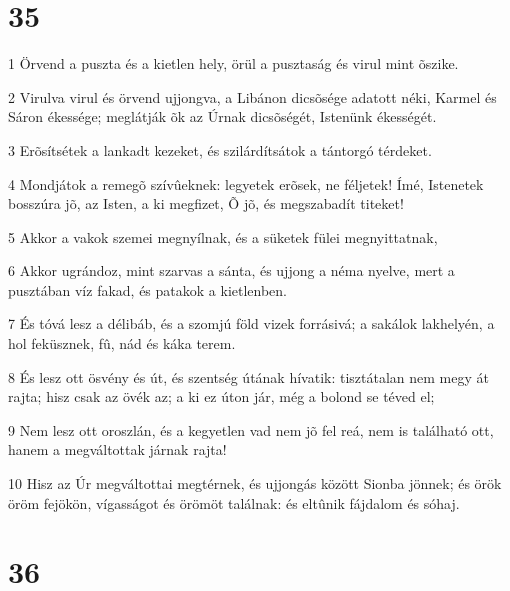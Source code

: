 \chapter{35}

\par 1 Örvend a puszta és a kietlen hely, örül a pusztaság és virul mint õszike.
\par 2 Virulva virul és örvend ujjongva, a Libánon dicsõsége adatott néki, Karmel és Sáron ékessége; meglátják õk az Úrnak dicsõségét, Istenünk ékességét.
\par 3 Erõsítsétek a lankadt kezeket, és szilárdítsátok a tántorgó térdeket.
\par 4 Mondjátok a remegõ szívûeknek: legyetek erõsek, ne féljetek! Ímé, Istenetek bosszúra jõ, az Isten, a ki megfizet, Õ jõ, és megszabadít titeket!
\par 5 Akkor a vakok szemei megnyílnak, és a süketek fülei megnyittatnak,
\par 6 Akkor ugrándoz, mint szarvas a sánta, és ujjong a néma nyelve, mert a pusztában víz fakad, és patakok a kietlenben.
\par 7 És tóvá lesz a délibáb, és a szomjú föld vizek forrásivá; a sakálok lakhelyén, a hol feküsznek, fû, nád és káka terem.
\par 8 És lesz ott ösvény és út, és szentség útának hívatik: tisztátalan nem megy át rajta; hisz csak az övék az; a ki ez úton jár, még a bolond se téved el;
\par 9 Nem lesz ott oroszlán, és a kegyetlen vad nem jõ fel reá, nem is található ott, hanem a megváltottak járnak rajta!
\par 10 Hisz az Úr megváltottai megtérnek, és ujjongás között Sionba jönnek; és örök öröm fejökön, vígasságot és örömöt találnak: és eltûnik fájdalom és sóhaj.

\chapter{36}


